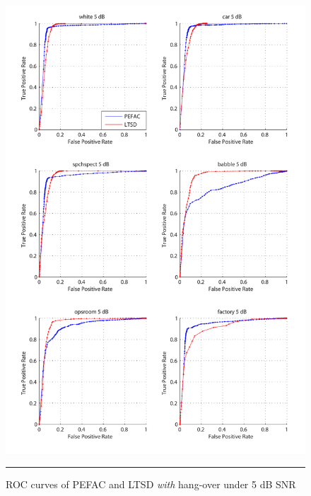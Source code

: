 \begin{figure}[htbp]
	\centering
		\includegraphics[width=1.0\columnwidth]{Figures/AppendixA/pefac5.pdf}
		\rule{37em}{0.5pt}
	\caption[ROC curves of PEFAC and LTSD \emph{with} hang-over under 5 dB SNR]{ROC curves of PEFAC and LTSD \emph{with} hang-over under 5 dB SNR}
	\label{fig:pefac5}
\end{figure}

